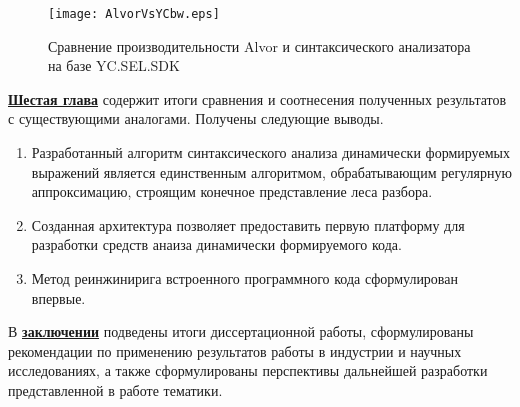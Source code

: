 \begin{figure}[]
 \centering
 \texttt{[image: AlvorVsYCbw.eps]}
 \caption{Сравнение производительности Alvor и синтаксического анализатора на базе YC.SEL.SDK}
 \label{fig:YCvsAlvor}
\end{figure}

\underline{\textbf{Шестая глава}} содержит итоги сравнения и соотнесения полученных результатов с существующими аналогами. Получены следующие выводы.
\begin{enumerate}
    \item Разработанный алгоритм синтаксического анализа динамически формируемых выражений является единственным алгоритмом, обрабатывающим регулярную аппроксимацию, строящим конечное представление леса разбора.
    \item Созданная архитектура позволяет предоставить первую платформу для разработки средств анаиза динамически формируемого кода.
    \item Метод реинжинирига встроенного программного кода сформулирован впервые.
\end{enumerate}



В \underline{\textbf{заключении}} подведены итоги диссертационной работы, сформулированы рекомендации по применению результатов работы в индустрии и научных исследованиях, а также сформулированы перспективы дальнейшей разработки представленной в работе тематики.

\newpage
\renewcommand{\refname}{\Large Публикации автора по теме диссертации}

